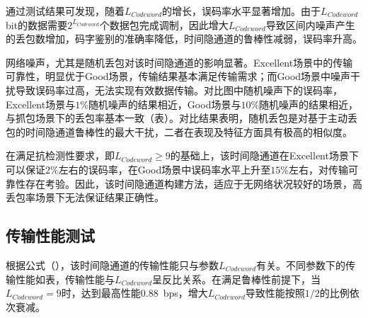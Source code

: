 通过测试结果可发现，随着$L_{Codeword}$的增长，误码率水平显著增加。由于$L_{Codeword}$ bit的数据需要$2^{L_{Codeword}}$个数据包完成调制，因此增大$L_{Codeword}$导致区间内噪声产生的丢包数增加，码字鉴别的准确率降低，时间隐通道的鲁棒性减弱，误码率升高。

网络噪声，尤其是随机丢包对该时间隐通道的影响显著。Excellent场景中的传输可靠性，明显优于Good场景，传输结果基本满足传输需求；而Good场景中噪声干扰导致误码率过高，无法实现有效数据传输。对比图中随机噪声下的误码率，Excellent场景与$1\%$随机噪声的结果相近，Good场景与$10\%$随机噪声的结果相近，与抓包场景下的丢包率基本一致（表）。对比结果表明，随机丢包是对基于主动丢包的时间隐通道鲁棒性的最大干扰，二者在表现及特征方面具有极高的相似度。

在满足抗检测性要求，即$L_{Codeword}\ge 9$的基础上，该时间隐通道在Excellent场景下可以保证$2\%$左右的误码率，在Good场景中误码率水平上升至$15\%$左右，对传输可靠性存在考验。因此，该时间隐通道构建方法，适应于无网络状况较好的场景，高丢包率场景下无法保证结果正确性。

\subsection{传输性能测试}
\label{chap:zigzag:results:throughput}


根据公式（），该时间隐通道的传输性能只与参数$L_{Codeword}$有关。不同参数下的传输性能如表，传输性能与$L_{Codeword}$呈反比关系。在满足鲁棒性前提下，当$L_{Codeword}=9$时，达到最高性能0.88\ bps，增大$L_{Codeword}$导致性能按照$1/2$的比例依次衰减。

